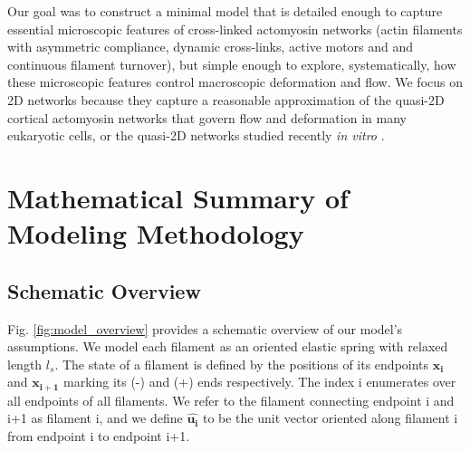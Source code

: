 Our goal was to construct a minimal model that is detailed enough to capture essential microscopic features of cross-linked actomyosin networks (actin filaments with asymmetric compliance, dynamic cross-links, active motors and and continuous filament turnover), but simple enough to explore, systematically, how these microscopic features control macroscopic deformation and flow. We focus on 2D networks because they capture a reasonable approximation of the quasi-2D cortical actomyosin networks that govern flow and deformation in many eukaryotic cells\cite{cellmech_flows, salbreuxbphs}, or the quasi-2D networks studied recently {\em in vitro} \cite{rheo_2D1,rheo_2D2}.




\section{Mathematical Summary of Modeling Methodology}

\subsection{Schematic Overview}
Fig. \ref{fig:model_overview} provides a schematic overview of our model's assumptions. We model each filament as an oriented elastic spring with relaxed length $l_s$. The state of a filament is defined by the positions of its endpoints $\mathbf{x_i}$ and $\mathbf{x_{i+1}}$ marking its (-) and (+) ends respectively. The index i enumerates over all endpoints of all filaments. We refer to the filament connecting endpoint i and i+1 as filament i, and we define $\mathbf{\hat{u_i}}$ to be the unit vector oriented along filament i from endpoint i to endpoint i+1.

